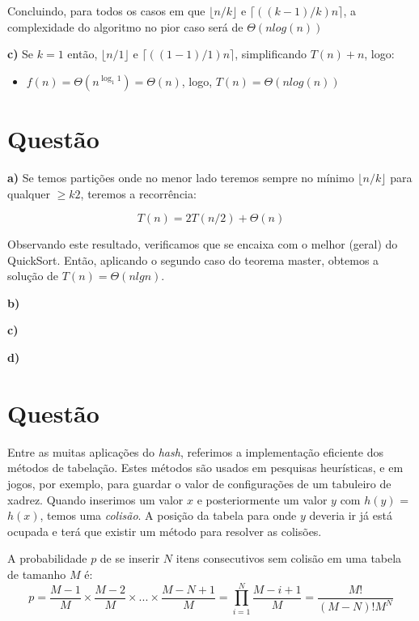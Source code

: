 \documentclass[a4paper,12pt]{article}
\begin{document}
\begin{description}
	Concluindo, para todos os casos em que $\lfloor n/k \rfloor$ e $\lceil ((k-1)/k)n \rceil$, a complexidade do algoritmo no pior caso será de $\Theta (n log(n))$ 

	\item{\textbf{c)}} Se $k=1$ então, $\lfloor n/1 \rfloor$ e $\lceil ((1-1)/1)n \rceil$, simplificando $T(n)+n$, logo:
	\begin{itemize}
		\item $f(n) = \Theta(n^{\log_1 1}) = \Theta(n)$, logo, $T(n) = \Theta(nlog(n))$
	\end{itemize}
\end{description}

\section{Questão}
\begin{description}
  \item{\textbf{a)}} Se temos partições onde no menor lado teremos sempre no mínimo $\lfloor n/k \rfloor$ para qualquer $\geq k 2$, teremos a recorrência:
  	
 $$T(n) = 2T(n/2) + \Theta(n)$$

 Observando este resultado, verificamos que se encaixa com o melhor (geral) do QuickSort. Então, aplicando o segundo caso do teorema master, obtemos a solução de $T(n) = \Theta(n lg n)$.

	\item{\textbf{b)}}
	\item{\textbf{c)}}
	\item{\textbf{d)}}
\end{description}

\section{Questão}
Entre as muitas aplicações do \textit{hash}, referimos a implementação eficiente dos métodos de tabelação. Estes métodos são usados em pesquisas heurísticas, e em jogos, por exemplo, para guardar o valor de configurações de um tabuleiro de xadrez.
Quando inserimos um valor $x$ e posteriormente um valor $y$ com $h(y)$ = $h(x)$, temos uma \textit{colisão}. A posição da tabela para onde $y$ deveria ir já está ocupada e terá que existir um método para resolver as colisões.

A probabilidade $p$ de se inserir $N$ itens consecutivos sem colisão em uma tabela de tamanho $M$ é:
	$$
	p = \frac{M-1}{M}\times\frac{M-2}{M}\times...\times\frac{M-N+1}{M} = \prod \limits_{i=1}^N \frac{M-i+1}{M} = \frac{M!}{(M-N)!M^N}
	$$
\end{document}
